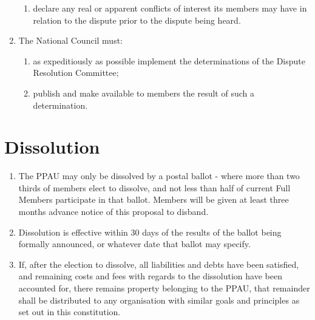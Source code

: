 \documentclass[a4paper,titlepage,8.5pt]{article}
\begin{document}
\begin{enumerate}
\begin{enumerate}
\item declare any real or apparent conflicts of interest its members may have in relation to the dispute prior to the dispute being heard.
\end{enumerate}
\item The National Council must:
\begin{enumerate}
\item as expeditiously as possible implement the determinations of the Dispute Resolution Committee;
\item publish and make available to members the result of such a determination.
\end{enumerate}
\end{enumerate}

\section{Dissolution}

\begin{enumerate}
\item The PPAU may only be dissolved by a postal ballot - where more than two thirds of members elect to dissolve, and not less than half of current Full Members participate in that ballot. Members will be given at least three months advance notice of this proposal to disband.
\item Dissolution is effective within 30 days of the results of the ballot being formally announced, or whatever date that ballot may specify.
\item If, after the election to dissolve, all liabilities and debts have been satisfied, and remaining costs and fees with regards to the dissolution have been accounted for, there remains property belonging to the PPAU, that remainder shall be distributed to any organisation with similar goals and principles as set out in this constitution.
\end{enumerate}
\end{document}
